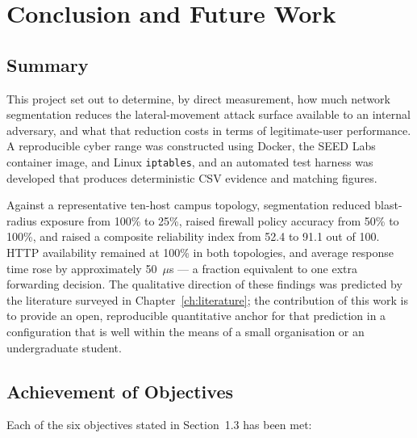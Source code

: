 \chapter{Conclusion and Future Work}
\label{ch:conclusion}

\section{Summary}

This project set out to determine, by direct measurement, how much network segmentation reduces the lateral-movement attack surface available to an internal adversary, and what that reduction costs in terms of legitimate-user performance. A reproducible cyber range was constructed using Docker, the SEED Labs container image, and Linux \texttt{iptables}, and an automated test harness was developed that produces deterministic CSV evidence and matching figures.

Against a representative ten-host campus topology, segmentation reduced blast-radius exposure from 100\% to 25\%, raised firewall policy accuracy from 50\% to 100\%, and raised a composite reliability index from 52.4 to 91.1 out of 100. HTTP availability remained at 100\% in both topologies, and average response time rose by approximately 50~$\mu$s --- a fraction equivalent to one extra forwarding decision. The qualitative direction of these findings was predicted by the literature surveyed in Chapter~\ref{ch:literature}; the contribution of this work is to provide an open, reproducible quantitative anchor for that prediction in a configuration that is well within the means of a small organisation or an undergraduate student.

\section{Achievement of Objectives}

Each of the six objectives stated in Section~1.3 has been met:


